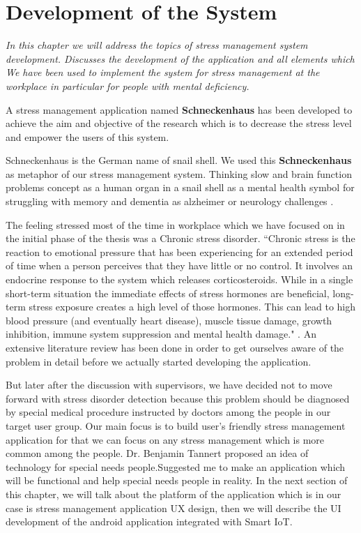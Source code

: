 \chapter{Development of the System}
\textit{In  this  chapter  we  will address  the  topics  of  stress management system development.  Discusses the development of the application and all elements which We  have  been used to implement the system for stress management at the  workplace  in  particular  for people with mental deficiency.}
\vspace{5mm}

A stress management application named \textbf{Schneckenhaus} has been developed to achieve the aim and objective of the research which is to decrease the stress level and empower the users of this system. 

Schneckenhaus is the German name of snail shell. We used this \textbf{Schneckenhaus} as metaphor of our stress management system. Thinking slow and brain function problems concept as a human organ in a snail shell as a mental health symbol for struggling with memory and dementia as alzheimer or neurology challenges \citep{Zachos2018TraumaResearch}.

The feeling stressed most of the time in workplace which we have focused on in the initial phase of the thesis was a Chronic stress disorder. “Chronic stress is the reaction to emotional pressure that has been experiencing for an extended period of time when a person perceives that they have little or no control. It involves an endocrine response to the system which releases corticosteroids. While in a single short-term situation the immediate effects of stress hormones are beneficial, long-term stress exposure creates a high level of those hormones. This can lead to high blood pressure (and eventually heart disease), muscle tissue damage, growth inhibition, immune system suppression \citep{Carlson2013PhysiologyBehavio} and mental health damage." \citep{Wiki2019ChronicWikipedia}. An extensive literature review has been done in order to get ourselves aware of the problem in detail before we actually started developing the application.

But later after the discussion with supervisors, we have decided not to move forward with stress disorder detection because this problem should be diagnosed by special medical procedure instructed by doctors among the people in our target user group. Our main focus is to build user's friendly stress management application for that we can focus on any stress management which is more common among the people. Dr. Benjamin Tannert proposed an idea of technology for special needs people.Suggested me to make an application which will be functional and help special needs people in reality. In the next section of this chapter, we will talk about the platform of the application which is in our case is stress management application \acf{UX} design, then we will describe the \acf{UI} development of the android application integrated with Smart \acs{IoT}.
